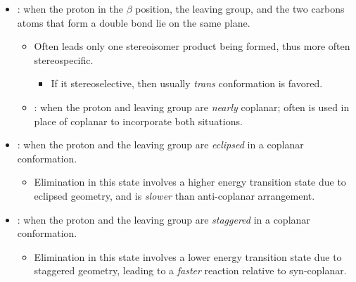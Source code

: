 \begin{itemize}
\begin{itemize}
\begin{itemize}
            \end{itemize}
        \item {}: when the proton in the \(\beta \) position, the leaving group, and the two carbons atoms that form a double bond lie on the same plane.
            \begin{itemize}
                \item Often leads only one stereoisomer product being formed, thus more often stereospecific.
                    \begin{itemize}
                        \item If it stereoselective, then usually \textit{trans} conformation is favored.
                    \end{itemize}
                \item {}: when the proton and leaving group are \emph{nearly} coplanar; often is used in place of coplanar to incorporate both situations.
            \end{itemize}
        \item {}: when the proton and the leaving group are \emph{ eclipsed} in a coplanar conformation.
            \begin{itemize}
                \item Elimination in this state involves a higher energy transition state due to eclipsed geometry, and is \emph{slower} than anti-coplanar arrangement.
            \end{itemize}
        \item {}: when the proton and the leaving group are \emph{staggered} in a coplanar conformation.
            \begin{itemize}
                \item Elimination in this state involves a lower energy transition state due to staggered geometry, leading to a \emph{faster} reaction relative to syn-coplanar.
            \end{itemize}
    \end{itemize}
\end{itemize}

\clearpage
